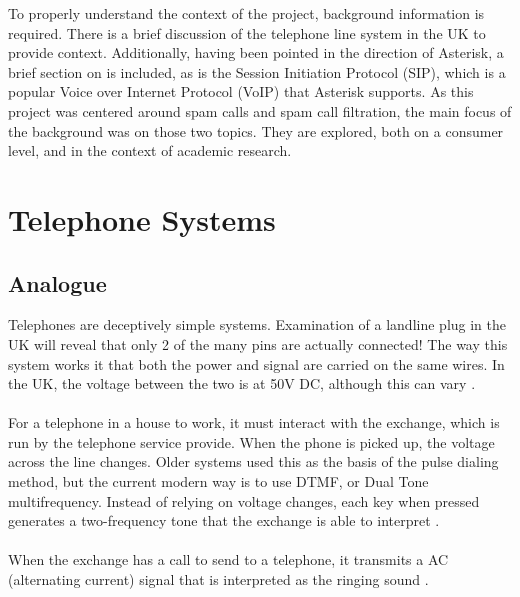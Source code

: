 \documentclass[main.tex]{subfiles}
\begin{document}
To properly understand the context of the project, background information is required. There is a brief discussion of the telephone line system in the UK to provide context. Additionally, having been pointed in the direction of Asterisk, a brief section on is included, as is the Session Initiation Protocol (SIP), which is a popular Voice over Internet Protocol (VoIP) that Asterisk supports. As this project was centered around spam calls and  spam call filtration, the main focus of the background was on those two topics. They are explored, both on a consumer level, and in the context of academic research.

\section{Telephone Systems}
\subsection{Analogue}
Telephones are deceptively simple systems. Examination of a landline plug in the UK will reveal that only 2 of the many pins are actually connected! The way this system works it that both the power and signal are carried on the same wires. In the UK, the voltage between the two is at 50V DC, although this can vary \cite{telephone}.
\\\\
For a telephone in a house to work, it must interact with the exchange, which is run by the telephone service provide. When the phone is picked up, the voltage across the line changes. Older systems used this as the basis of the pulse dialing method, but the current modern way is to use DTMF, or Dual Tone multifrequency. Instead of relying on voltage changes, each key when pressed generates a two-frequency tone that the exchange is able to interpret \cite{telephone}.
\\\\
When the exchange has a call to send to a telephone, it transmits a AC (alternating current) signal that is interpreted as the ringing sound \cite{telephone}.

\end{document}
